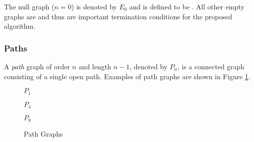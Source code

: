 The null graph (\(n=0\)) is denoted by \(E_0\) and is defined to be .  All other empty graphs are
 and thus are important termination conditions for the proposed algorithm.

\subsubsection{Paths}

A \emph{path} graph of order \(n\) and length \(n-1\), denoted by \(P_n\), is a connected graph consisting of a
single open path.  Examples of path graphs are shown in Figure \ref{fig:path}.

\begin{figure}[h]
  \label{fig:path}
  \begin{minipage}{1.5in}
    \begin{center}

      \bigskip

      \(P_1\)
    \end{center}
  \end{minipage}
  \begin{minipage}{2.5in}
    \begin{center}

      \bigskip

      \(P_4\)
    \end{center}
  \end{minipage}
  \begin{minipage}{2in}
    \begin{center}

      \bigskip

      \(P_9\)
    \end{center}
  \end{minipage}
  \caption{Path Graphs}
\end{figure}

